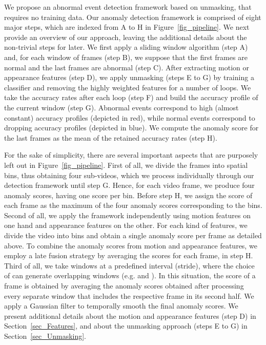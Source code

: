 \documentclass[10pt,twocolumn,letterpaper]{article}
\begin{document}
We propose an abnormal event detection framework based on unmasking, that requires no training data. Our anomaly detection framework is comprised of eight major steps, which are indexed from A to H in Figure~\ref{fig_pipeline}. We next provide an overview of our approach, leaving the additional details about the non-trivial steps for later. We first apply a sliding window algorithm (step A) and, for each window of  frames (step B), we suppose that the first  frames are normal and the last  frames are abnormal (step C). After extracting motion or appearance features (step D), we apply unmasking (steps E to G) by training a classifier and removing the highly weighted features for a number of  loops. We take the accuracy rates after each loop (step F) and build the accuracy profile of the current window (step G). Abnormal events correspond to high (almost constant) accuracy profiles (depicted in red), while normal events correspond to dropping accuracy profiles (depicted in blue). We compute the anomaly score for the last  frames as the mean of the retained accuracy rates (step H).

For the sake of simplicity, there are several important aspects that are purposely left out in Figure~\ref{fig_pipeline}. 
First of all, we divide the frames into  spatial bins, thus obtaining four sub-videos, which we process individually through our detection framework until step G. Hence, for each video frame, we produce four anomaly scores, having one score per bin. Before step H, we assign the score of each frame as the maximum of the four anomaly scores corresponding to the  bins. 
Second of all, we apply the framework independently using motion features on one hand and appearance features on the other. For each kind of features, we divide the video into  bins and obtain a single anomaly score per frame as detailed above. To combine the anomaly scores from motion and appearance features, we employ a late fusion strategy by averaging the scores for each frame, in step H.
Third of all, we take windows at a predefined interval  (stride), where the choice of  can generate overlapping windows (e.g.  and ). In this situation, the score of a frame is obtained by averaging the anomaly scores obtained after processing every separate window that includes the respective frame in its second half. We apply a Gaussian filter to temporally smooth the final anomaly scores. We present additional details about the motion and appearance features (step D) in Section~\ref{sec_Features}, and about the unmasking approach (steps E to G) in Section~\ref{sec_Unmasking}.
\end{document}
